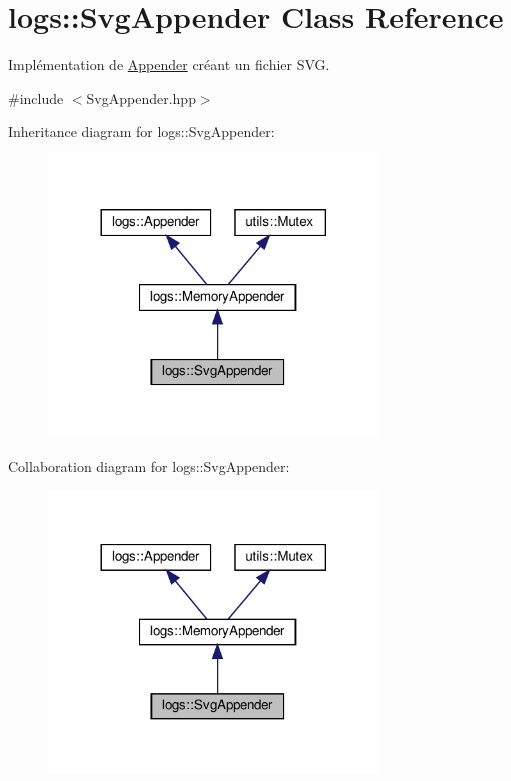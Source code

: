 \hypertarget{classlogs_1_1SvgAppender}{}\section{logs\+:\+:Svg\+Appender Class Reference}
\label{classlogs_1_1SvgAppender}


Implémentation de \hyperlink{classlogs_1_1Appender}{Appender} créant un fichier S\+VG.  




{\ttfamily \#include $<$Svg\+Appender.\+hpp$>$}



Inheritance diagram for logs\+:\+:Svg\+Appender\+:
\nopagebreak
\begin{figure}[H]
\begin{center}
\leavevmode
\includegraphics[width=248pt]{classlogs_1_1SvgAppender__inherit__graph}
\end{center}
\end{figure}


Collaboration diagram for logs\+:\+:Svg\+Appender\+:
\nopagebreak
\begin{figure}[H]
\begin{center}
\leavevmode
\includegraphics[width=248pt]{classlogs_1_1SvgAppender__coll__graph}
\end{center}
\end{figure}
